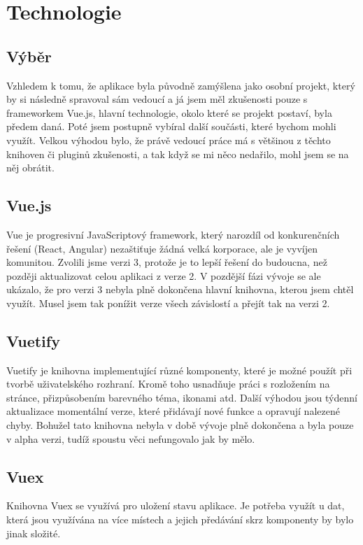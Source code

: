 
\chapter{Technologie}

\section{Výběr}
Vzhledem k tomu, že aplikace byla původně zamýšlena jako osobní projekt, který by si následně spravoval sám vedoucí a já
jsem měl zkušenosti pouze s frameworkem Vue.js, hlavní technologie, okolo které se projekt postaví, byla předem daná. Poté
jsem postupně vybíral další součásti, které bychom mohli využít. Velkou výhodou bylo, že právě vedoucí práce má s většinou
z těchto knihoven či pluginů zkušenosti, a tak když se mi něco nedařilo, mohl jsem se na něj obrátit.


\section{Vue.js}
Vue je progresivní JavaScriptový framework, který narozdíl od konkurenčních řešení (React, Angular) nezaštiťuje žádná velká
korporace, ale je vyvíjen komunitou.\cite{VueJS} Zvolili jsme verzi 3, protože je to lepší řešení do budoucna, než později aktualizovat
celou aplikaci z verze 2. V pozdější fázi vývoje se ale ukázalo, že pro verzi 3 nebyla plně dokončena hlavní knihovna, kterou jsem chtěl využít.
Musel jsem tak ponížit verze všech závislostí a přejít tak na verzi 2.

\section{Vuetify}
Vuetify je knihovna implementující různé komponenty, které je možné použít při tvorbě uživatelského rozhraní. Kromě toho
usnadňuje práci s rozložením na stránce, přizpůsobením barevného téma, ikonami atd. Další výhodou jsou týdenní aktualizace
momentální verze, které přidávají nové funkce a opravují nalezené chyby.\cite{VuetifyWhy}
Bohužel tato knihovna nebyla v době vývoje plně dokončena a byla pouze v alpha verzi, tudíž spoustu věci nefungovalo jak by mělo.

\section{Vuex}
Knihovna Vuex se využívá pro uložení stavu aplikace. Je potřeba využít u dat, která jsou využívána na více místech a jejich
předávání skrz komponenty by bylo jinak složité.

